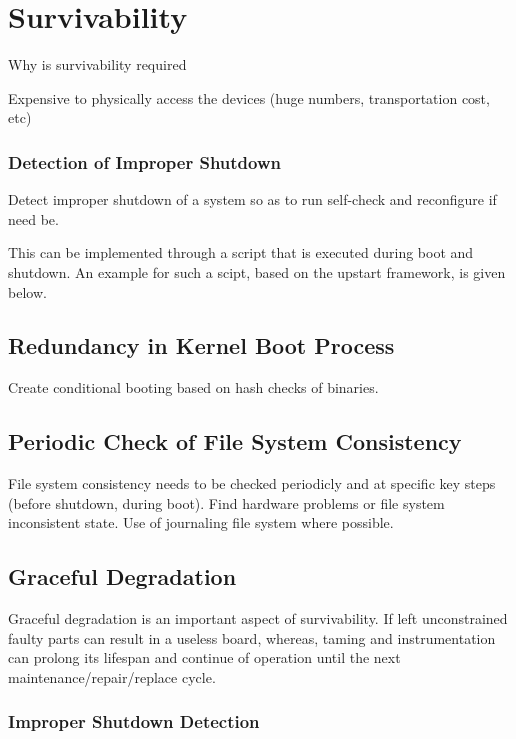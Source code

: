 \section{Survivability}

Why is survivability required

Expensive to physically access the devices (huge numbers, transportation cost, etc)

\subsubsection{Detection of Improper Shutdown}

Detect improper shutdown of a system so as to run self-check and reconfigure if need be.

This can be implemented through a script that is executed during boot and shutdown. An example for such a scipt, based on the upstart framework, is given below.



\subsection{Redundancy in Kernel Boot Process}

Create conditional booting based on hash checks of binaries.

\subsection{Periodic Check of File System Consistency}

File system consistency needs to be checked periodicly and at specific key steps (before shutdown, during boot). Find hardware problems or file system inconsistent state. Use of journaling file system where possible.

\subsection{Graceful Degradation}
Graceful degradation is an important aspect of survivability. If left unconstrained faulty parts can result in a useless board, whereas, taming and instrumentation can prolong its lifespan and continue of operation until the next maintenance/repair/replace cycle.

\subsubsection{Improper Shutdown Detection}

